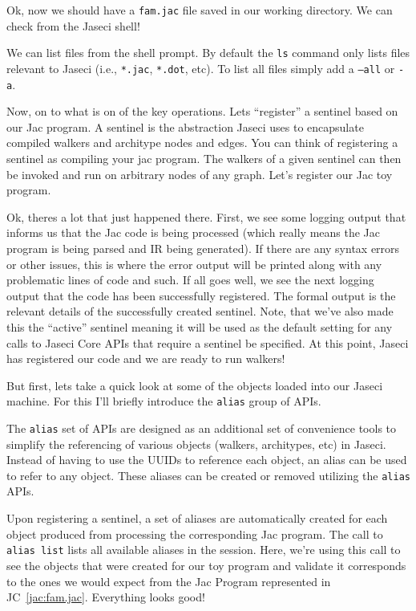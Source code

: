 \par
Ok, now we should have a \texttt{fam.jac} file saved in our working directory. We can check from the Jaseci shell!
\par
{}
\par
We can list files from the shell prompt. By default the \texttt{ls} command only lists files relevant to Jaseci (i.e., \texttt{*.jac}, \texttt{*.dot}, etc). To list all files simply add a \texttt{--all} or \texttt{-a}. 
\par
Now, on to what is on of the key operations. Lets ``register'' a \gls{sentinel} based on our Jac program. A sentinel is the abstraction Jaseci uses to encapsulate compiled walkers and architype nodes and edges. You can think of registering a sentinel as compiling your jac program. The walkers of a given sentinel can then be invoked and run on arbitrary nodes of any graph. Let's register our Jac toy program.  
\par
{}
\par
Ok, theres a lot that just happened there. First, we see some logging output that informs us that the Jac code is being processed (which really means the Jac program is being parsed and IR being generated). If there are any syntax errors or other issues, this is where the error output will be printed along with any problematic lines of code and such. If all goes well, we see the next logging output that the code has been successfully registered. The formal output is the relevant details of the successfully created sentinel. Note, that we've also made this the ``active'' sentinel meaning it will be used as the default setting for any calls to Jaseci Core APIs that require a sentinel be specified. At this point, Jaseci has registered our code and we are ready to run walkers!
\par
But first, lets take a quick look at some of the objects loaded into our Jaseci machine. For this I'll briefly introduce the \texttt{alias} group of APIs. 
\par
{}
\par
The \texttt{alias} set of APIs are designed as an additional set of convenience tools to simplify the referencing of various objects (walkers, architypes, etc) in Jaseci. Instead of having to use the UUIDs to reference each object, an alias can be used to refer to any object. These aliases can be created or removed utilizing the \texttt{alias} APIs. 
\par
Upon registering a sentinel, a set of aliases are automatically created for each object produced from processing the corresponding Jac program. The call to \texttt{alias list} lists all available aliases in the session. Here, we're using this call to see the objects that were created for our toy program and validate it corresponds to the ones we would expect from the Jac Program represented in JC~\ref{jac:fam.jac}. Everything looks good! 
